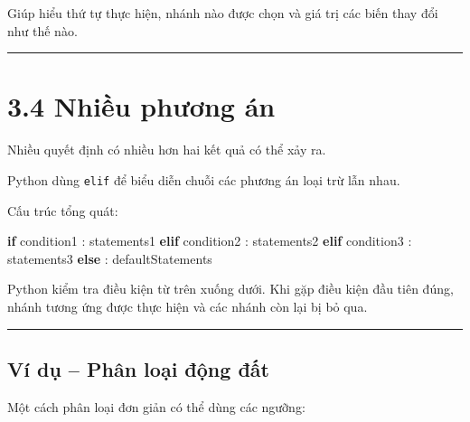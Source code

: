 \documentclass[
  11pt,
  a4paper,
]{article}
\newenvironment{Shaded}{}{}
\newcommand{\ControlFlowTok}[1]{\textcolor[rgb]{0.00,0.44,0.13}{\textbf{#1}}}
\newcommand{\NormalTok}[1]{#1}
\begin{document}
Giúp hiểu thứ tự thực hiện, nhánh nào được chọn và giá trị các biến thay
đổi như thế nào.

\begin{center}\rule{0.5\linewidth}{0.5pt}\end{center}

\section{3.4 Nhiều phương án}\label{nhiux1ec1u-phux1b0ux1a1ng-uxe1n}

Nhiều quyết định có nhiều hơn hai kết quả có thể xảy ra.

Python dùng \texttt{elif} để biểu diễn chuỗi các phương án loại trừ lẫn
nhau.

Cấu trúc tổng quát:

\begin{Shaded}
\begin{Highlighting}[]
\ControlFlowTok{if}\NormalTok{ condition1 :}
\NormalTok{    statements1}
\ControlFlowTok{elif}\NormalTok{ condition2 :}
\NormalTok{    statements2}
\ControlFlowTok{elif}\NormalTok{ condition3 :}
\NormalTok{    statements3}
\ControlFlowTok{else}\NormalTok{ :}
\NormalTok{    defaultStatements}
\end{Highlighting}
\end{Shaded}

Python kiểm tra điều kiện từ trên xuống dưới. Khi gặp điều kiện đầu tiên
đúng, nhánh tương ứng được thực hiện và các nhánh còn lại bị bỏ qua.

\begin{center}\rule{0.5\linewidth}{0.5pt}\end{center}

\subsection{Ví dụ -- Phân loại động
đất}\label{vuxed-dux1ee5-phuxe2n-loux1ea1i-ux111ux1ed9ng-ux111ux1ea5t}

Một cách phân loại đơn giản có thể dùng các ngưỡng:
\end{document}
